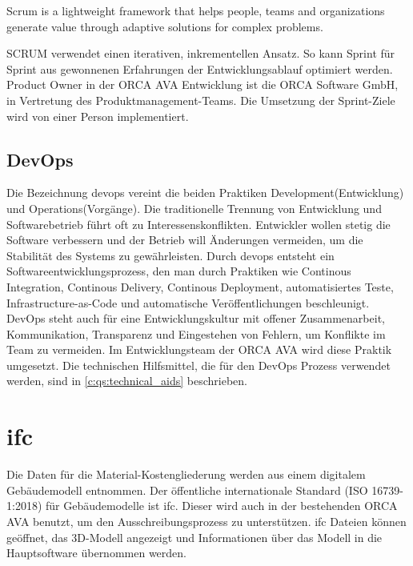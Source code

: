 \begin{definition}[Scrum]
	\glqq Scrum is a lightweight framework that helps people, teams and organizations generate value through adaptive solutions for complex problems. \grqq{} \citep[vgl.][p.~3]{scrum_2020}
\end{definition}

SCRUM verwendet einen iterativen, inkrementellen Ansatz. So kann Sprint für Sprint aus gewonnenen Erfahrungen der Entwicklungsablauf optimiert werden. \citep[vgl.][]{scrum_2020} Product Owner in der ORCA AVA Entwicklung ist die \glqq ORCA Software GmbH\grqq{}, in Vertretung des Produktmanagement-Teams. Die Umsetzung der Sprint-Ziele wird von einer Person implementiert.

\subsection{DevOps}
\label{c:basics:project-management:devops}
Die Bezeichnung \ac{devops} vereint die beiden Praktiken \glqq Development\grqq{}(Entwicklung) und \glqq Operations\grqq{}(Vorgänge). Die traditionelle Trennung von Entwicklung und Softwarebetrieb führt oft zu
Interessenskonflikten. Entwickler wollen stetig die Software verbessern und der Betrieb will Änderungen vermeiden, um die Stabilität des Systems zu gewährleisten. Durch \ac{devops} entsteht ein Softwareentwicklungsprozess, den man durch Praktiken wie Continous Integration, Continous Delivery, Continous Deployment, automatisiertes Teste, Infrastructure-as-Code und automatische Veröffentlichungen beschleunigt. DevOps steht auch für eine Entwicklungskultur mit offener Zusammenarbeit, Kommunikation, Transparenz und Eingestehen von Fehlern, um Konflikte im Team zu vermeiden. \citep[vgl.][]{devops_2021} Im Entwicklungsteam der ORCA AVA wird diese Praktik umgesetzt. Die technischen Hilfsmittel, die für den DevOps Prozess verwendet werden, sind in \autoref{c:qs:technical_aids} beschrieben.

\section{\acf{ifc}}
\label{c:basics:ifc}
Die Daten für die Material-Kostengliederung werden aus einem digitalem Gebäudemodell entnommen. Der öffentliche internationale Standard (ISO 16739-1:2018) für Gebäudemodelle ist \ac{ifc}. \citep[vgl.][]{BuildingSMART_IFC4_doc} Dieser wird auch in der bestehenden ORCA AVA benutzt, um den Ausschreibungsprozess zu unterstützen. \ac{ifc} Dateien können geöffnet, das 3D-Modell angezeigt und Informationen über das Modell in die Hauptsoftware übernommen werden.

